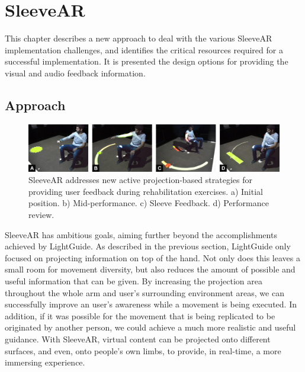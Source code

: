 \chapter{SleeveAR}
\label{sec:sleevear}


This chapter describes a new approach to deal with the various SleeveAR implementation challenges, and  identifies the critical resources required for a successful implementation. It is presented the design options for providing the visual and audio feedback information.

\section{Approach}
\label{sec:sleevear:approach}

\begin{figure}[!t]
    \begin{center}
        \includegraphics[width=\textwidth]{imgs/impl/teaser.jpg}
    \end{center}
    \caption{SleeveAR addresses new active projection-based strategies for providing user feedback during rehabilitation exercises. a) Initial position. b) Mid-performance. c) Sleeve Feedback. d) Performance review.}
    \label{fig:teaser}
\end{figure}

SleeveAR has ambitious goals, aiming further beyond the accomplishments achieved by LightGuide. 
As described in the previous section, LightGuide only focused on projecting information on top of the hand. Not only does this leaves a small room for movement diversity, but also reduces the amount of possible and useful information that can be given.
By increasing the projection area throughout the whole arm and user's surrounding environment areas, we can successfully improve an user's awareness while a movement is being executed. 
In addition, if it was possible for the movement that is being replicated to be originated by another person, we could achieve a much more realistic and useful guidance.
With SleeveAR, virtual content can be projected onto different surfaces, and even, onto people's own limbs, to provide, in real-time, a more immersing experience. 


